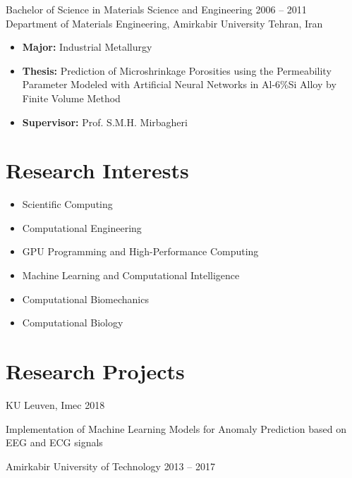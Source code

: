 \documentclass{cv}
\begin{document}
\longdatedsubsection
{Bachelor of Science in Materials Science and Engineering}
{2006 -- 2011} 
{Department of Materials Engineering, Amirkabir University} 
{Tehran, Iran} 

\begin{itemize}

\item 
\textbf{Major:} Industrial Metallurgy

\item
\textbf{Thesis:} Prediction of Microshrinkage Porosities using the Permeability Parameter Modeled with Artificial Neural Networks in Al-6\%Si Alloy by Finite Volume Method

\item
\textbf{Supervisor:} Prof. S.M.H. Mirbagheri


\end{itemize}


\section{Research Interests}

\begin{itemize}
\item
Scientific Computing
\item
Computational Engineering
\item
GPU Programming and High-Performance Computing
\item
Machine Learning and Computational Intelligence
\item
Computational Biomechanics
\item
Computational Biology
\end{itemize}


\section{Research Projects}

\datedsubsection
{KU Leuven, Imec}
{2018}

{}Implementation of Machine Learning Models for Anomaly Prediction based on EEG and ECG signals

\datedsubsection
{Amirkabir University of Technology}
{2013 -- 2017}
\end{document}
